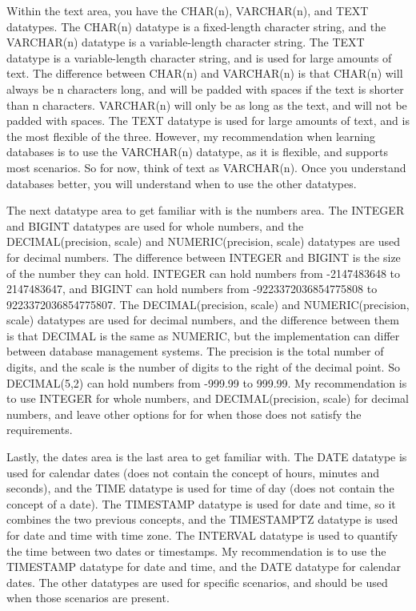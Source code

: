 Within the text area, you have the CHAR(n), VARCHAR(n), and TEXT datatypes. The CHAR(n) datatype is a fixed-length character string, and the VARCHAR(n) datatype is a variable-length character string. The TEXT datatype is a variable-length character string, and is used for large amounts of text. The difference between CHAR(n) and VARCHAR(n) is that CHAR(n) will always be n characters long, and will be padded with spaces if the text is shorter than n characters. VARCHAR(n) will only be as long as the text, and will not be padded with spaces. The TEXT datatype is used for large amounts of text, and is the most flexible of the three. However, my recommendation when learning databases is to use the VARCHAR(n) datatype, as it is flexible, and supports most scenarios. So for now, think of text as VARCHAR(n). Once you understand databases better, you will understand when to use the other datatypes.

The next datatype area to get familiar with is the numbers area. The INTEGER and BIGINT datatypes are used for whole numbers, and the DECIMAL(precision, scale) and NUMERIC(precision, scale) datatypes are used for decimal numbers. The difference between INTEGER and BIGINT is the size of the number they can hold. INTEGER can hold numbers from -2147483648 to 2147483647, and BIGINT can hold numbers from -9223372036854775808 to 9223372036854775807. The DECIMAL(precision, scale) and NUMERIC(precision, scale) datatypes are used for decimal numbers, and the difference between them is that DECIMAL is the same as NUMERIC, but the implementation can differ between database management systems. The precision is the total number of digits, and the scale is the number of digits to the right of the decimal point. So DECIMAL(5,2) can hold numbers from -999.99 to 999.99. My recommendation is to use INTEGER for whole numbers, and DECIMAL(precision, scale) for decimal numbers, and leave other options for for when those does not satisfy the requirements.

Lastly, the dates area is the last area to get familiar with. The DATE datatype is used for calendar dates (does not contain the concept of hours, minutes and seconds), and the TIME datatype is used for time of day (does not contain the concept of a date). The TIMESTAMP datatype is used for date and time, so it combines the two previous concepts, and the TIMESTAMPTZ datatype is used for date and time with time zone. The INTERVAL datatype is used to quantify the time between two dates or timestamps. My recommendation is to use the TIMESTAMP datatype for date and time, and the DATE datatype for calendar dates. The other datatypes are used for specific scenarios, and should be used when those scenarios are present.

